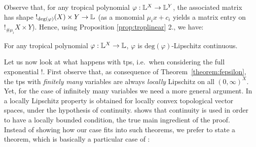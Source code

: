 

Observe that, for any tropical polynomial $\varphi:\mathbb{L}^{X}\to \mathbb{L}^{Y}$, the associated matrix has shape $!_{\mathrm{deg}(\varphi)}(X)\times Y\to \mathbb{L}$ (as a monomial $\mu_ix+c_{i}$ yields a matrix entry on $!_{\#\mu_i}X\times Y$). Hence, using Proposition \ref{prop:troplinear} 2., we have:
\begin{corollary}\label{prop:polylip}
For any tropical polynomial $\varphi:\mathbb{L}^{X}\to\mathbb{L}$, $\varphi$ is $\mathrm{deg}(\varphi)$-Lipschitz continuous.
\end{corollary}

Let us now look at what happens with tps, i.e.~when considering the full exponential $!$.
First observe that, as consequence of Theorem~\ref{theorem:fepsilon}, the tps with \emph{finitely many} variables are always \emph{locally} Lipschitz on all $(0,\infty)^X$. Yet, for the case of infinitely many variables we need a more general argument.
In \cite[Theorem 6.4]{Cobzas2017} a locally Lipschitz property is obtained for locally convex topological vector spaces, under the hypothesis of continuity. \cite[Proposition 6.5]{Cobzas2017} shows that continuity is used in order to have a locally bounded condition, the true main ingredient of the proof.
Instead of showing how our case fits into such theorems, we prefer to state a theorem, which is basically a particular case of \cite[Theorem 6.9, Lemma 6.10]{Cobzas2017}:

